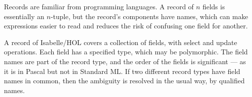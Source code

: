 %
\begin{isabellebody}%
\def\isabellecontext{Records}%
%
\isamarkuptrue%
\isamarkupfalse%
%
\begin{isamarkuptext}%
%
  Records are familiar from programming languages.  A record of $n$
  fields is essentially an $n$-tuple, but the record's components have
  names, which can make expressions easier to read and reduces the
  risk of confusing one field for another.

  A record of Isabelle/HOL covers a collection of fields, with select
  and update operations.  Each field has a specified type, which may
  be polymorphic.  The field names are part of the record type, and
  the order of the fields is significant --- as it is in Pascal but
  not in Standard ML.  If two different record types have field names
  in common, then the ambiguity is resolved in the usual way, by
  qualified names.


\end{isamarkuptext}
\end{isabellebody}
